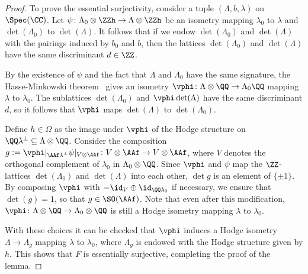 \begin{proof}
To prove the essential surjectivity, consider a tuple $(\Lambda,b,\lambda)$ on $\Spec(\CC)$. Let $\psi\colon \Lambda_0 \otimes \ZZh \rightarrow \Lambda \otimes \ZZh$ be an isometry mapping $\lambda_0$ to $\lambda$ and $\det(\Lambda_0)$ to $\det(\Lambda)$. It follows that if we endow $\det(\Lambda_0)$ and $\det(\Lambda)$ with the pairings induced by $b_0$ and $b$, then the lattices $\det(\Lambda_0)$ and $\det(\Lambda)$ have the same discriminant $d \in \ZZ$.

By the existence of $\psi$ and the fact that $\Lambda$ and $\Lambda_0$ have the same signature, the Hasse-Minkowski theorem~\cite[Chapter~IV, Theorem~9]{SerreCourse} gives an isometry $\vphi\colon \Lambda \otimes \QQ \rightarrow \Lambda_0 \QQ$ mapping $\lambda$ to $\lambda_0$. The sublattices $\det(\Lambda_0)$ and $\vphi \det(\Lambda)$ have the same discriminant $d$, so it follows that $\vphi$ maps $\det(\Lambda)$ to $\det(\Lambda_0)$.

    Define $h \in \Omega$ as the image under $\vphi$ of the Hodge structure on $\QQ \lambda^{\perp} \subseteq \Lambda \otimes \QQ$. Consider the composition $g := \vphi|_{\AAf \lambda^{\perp}} \psi|_{V \otimes \AAf}\colon V \otimes \AAf \rightarrow V \otimes \AAf$, where $V$ denotes the orthogonal complement of $\lambda_0$ in $\Lambda_0 \otimes \QQ$. Since $\vphi$ and $\psi$ map the $\ZZ$-lattices $\det(\Lambda_0)$ and $\det(\Lambda)$ into each other, $\det g$ is an element of $\{\pm 1\}$. By composing $\vphi$ with $-\id_{V} \oplus \id_{\QQ\lambda_0}$ if necessary, we ensure that $\det(g) = 1$, so that $g \in \SO(\AAf)$. Note that even after this modification, $\vphi\colon \Lambda \otimes \QQ \rightarrow \Lambda_0 \otimes \QQ$ is still a Hodge isometry mapping $\lambda$ to $\lambda_0$.

With these choices it can be checked that $\vphi$ induces a Hodge isometry $\Lambda \rightarrow \Lambda_g$ mapping $\lambda$ to $\lambda_0$, where $\Lambda_g$ is endowed with the Hodge structure given by $h$. This shows that $F$ is essentially surjective, completing the proof of the lemma.
\end{proof}

%
